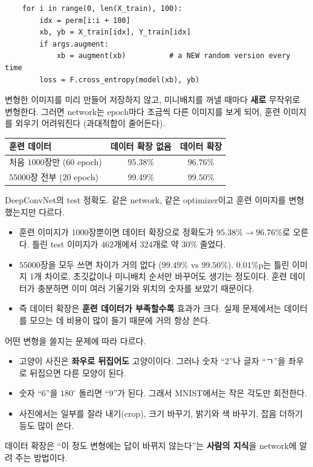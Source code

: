 \documentclass[11pt,a4paper]{article}
\begin{document}
\begin{lstlisting}
    for i in range(0, len(X_train), 100):
        idx = perm[i:i + 100]
        xb, yb = X_train[idx], Y_train[idx]
        if args.augment:
            xb = augment(xb)          # a NEW random version every time
        loss = F.cross_entropy(model(xb), yb)
\end{lstlisting}

변형한 이미지를 미리 만들어 저장하지 않고, 미니배치를 꺼낼 때마다 \textbf{새로} 무작위로 변형한다.
그러면 network는 epoch마다 조금씩 다른 이미지를 보게 되어, 훈련 이미지를 외우기 어려워진다 (과대적합이 줄어든다).

\begin{center}
{\small
\begin{tabular}{@{}lcc@{}}
\toprule
훈련 데이터 & 데이터 확장 없음 & 데이터 확장 \\
\midrule
처음 $1000$장만 ($60$ epoch) & $95.38\%$ & $96.76\%$ \\
$55000$장 전부 ($20$ epoch) & $99.49\%$ & $99.50\%$ \\
\bottomrule
\end{tabular}}

DeepConvNet의 test 정확도. 같은 network, 같은 optimizer이고 훈련 이미지를 변형했는지만 다르다.
\end{center}

\begin{itemize}[leftmargin=1.5em]
\item 훈련 이미지가 $1000$장뿐이면 데이터 확장으로 정확도가 $95.38\%\to96.76\%$로 오른다.
틀린 test 이미지가 $462$개에서 $324$개로 약 $30\%$ 줄었다.
\item $55000$장을 모두 쓰면 차이가 거의 없다 ($99.49\%$ vs $99.50\%$). $0.01\%$p는 틀린 이미지 $1$개 차이로,
초깃값이나 미니배치 순서만 바꾸어도 생기는 정도이다.
훈련 데이터가 충분하면 이미 여러 기울기와 위치의 숫자를 보았기 때문이다.
\item 즉 데이터 확장은 \textbf{훈련 데이터가 부족할수록} 효과가 크다.
실제 문제에서는 데이터를 모으는 데 비용이 많이 들기 때문에 거의 항상 쓴다.
\end{itemize}

\begin{remarkbox}
어떤 변형을 쓸지는 문제에 따라 다르다.
\begin{itemize}[leftmargin=1.5em]
\item 고양이 사진은 \textbf{좌우로 뒤집어도} 고양이이다. 그러나 숫자 ``$2$''나 글자 ``ㄱ''을 좌우로 뒤집으면 다른 모양이 된다.
\item 숫자 ``$6$''을 $180^\circ$ 돌리면 ``$9$''가 된다. 그래서 MNIST에서는 작은 각도만 회전한다.
\item 사진에서는 일부를 잘라 내기(crop), 크기 바꾸기, 밝기와 색 바꾸기, 잡음 더하기 등도 많이 쓴다.
\end{itemize}
데이터 확장은 ``이 정도 변형에는 답이 바뀌지 않는다''는 \textbf{사람의 지식}을 network에 알려 주는 방법이다.
\end{remarkbox}
\end{document}
